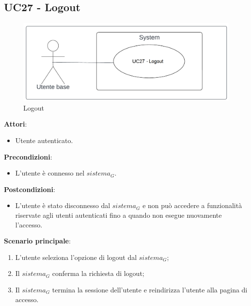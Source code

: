 \subsection{UC27 - Logout}\label{usecase:27}
\begin{figure}[H]
\centering
\includegraphics[width=0.75\linewidth]{ucd/UCD27.png}
\caption{Logout}
\end{figure}
\textbf{Attori}:
\begin{itemize}
    \item Utente autenticato.
\end{itemize}
\textbf{Precondizioni}:
\begin{itemize}
    \item L'utente è connesso nel $\textit{sistema}_G$.
\end{itemize}
\textbf{Postcondizioni}:
\begin{itemize}
    \item L'utente è stato disconnesso dal $\textit{sistema}_G$ e non può accedere a funzionalità riservate agli utenti autenticati fino a quando non esegue nuovamente l'accesso.
\end{itemize}
\textbf{Scenario principale}:
\begin{enumerate}
    \item L'utente seleziona l'opzione di logout dal $\textit{sistema}_G$;
    \item Il $\textit{sistema}_G$ conferma la richiesta di logout;
    \item Il $\textit{sistema}_G$ termina la sessione dell'utente e reindirizza l'utente alla pagina di accesso.
\end{enumerate}

\newpage